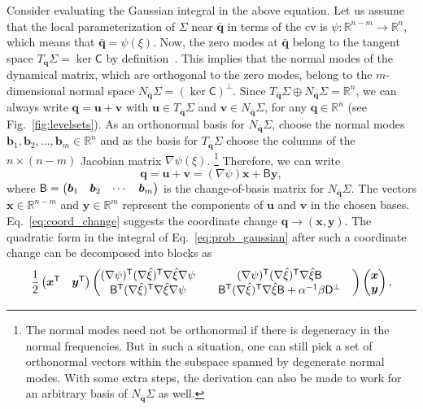Consider evaluating the Gaussian integral in the above equation.
Let us assume that the local parameterization of $\Sigma$ near $\bar{\bm{q}}$ in terms of the \ac{cv} is $\psi: \mathbb{R}^{n-m} \to \mathbb{R}^n$, which means that $\bar{\bm{q}} = \psi(\xi)$.
Now, the zero modes at $\bar{\bm{q}}$ belong to the tangent space $T_{\bar{\bm{q}}}\Sigma = \ker \mathsf{C}$ by definition~\cite{leimkuhler2005}.
This implies that the normal modes of the dynamical matrix, which are orthogonal to the zero modes, belong to the $m$-dimensional normal space $N_{\bar{\bm{q}}}\Sigma = (\ker\mathsf{C})^\perp$.
Since $T_{\bar{\bm{q}}}\Sigma \oplus N_{\bar{\bm{q}}}\Sigma = \mathbb{R}^n$, we can always write $\bm{q} = \bm{u} + \bm{v}$ with
$\bm{\bm{u}} \in T_{\bar{\bm{q}}}\Sigma$ and $\bm{v} \in N_{\bar{\bm{q}}}\Sigma$, for any $\bm{q} \in \mathbb{R}^n$ (see Fig.~\ref{fig:levelsets}).
As an orthonormal basis for $N_{\bar{\bm{q}}}\Sigma$, choose the normal modes $\bm{b}_1, \bm{b}_2, \ldots, \bm{b}_m \in \mathbb{R}^n$ and as the basis for $T_{\bar{\bm{q}}}\Sigma$ choose the columns of the $n\times(n-m)$ Jacobian matrix $\nabla\psi(\xi)$.%
\footnote{The normal modes need not be orthonormal if there is degeneracy in the normal frequencies.
But in such a situation, one can still pick a set of orthonormal vectors within the subspace spanned by degenerate normal modes.
With some extra steps, the derivation can also be made to work for an arbitrary basis of $N_{\bar{\bm{q}}}\Sigma$ as well.}
Therefore, we can write
%
\begin{equation}
  \bm{q} = \bm{u} + \bm{v} = (\nabla\psi)\bm{x} + \mathsf{B}\bm{y},
  \label{eq:coord_change}
\end{equation}
%
where $\mathsf{B}  = \begin{pmatrix}\bm{b}_1 & \bm{b}_2 & \cdots & \bm{b}_m\end{pmatrix}$ is the change-of-basis matrix for $N_{\bar{\bm{q}}}\Sigma$.
The vectors $\bm{x} \in \mathbb{R}^{n-m}$ and $\bm{y} \in \mathbb{R}^m$ represent the components of $\bm{u}$ and $\bm{v}$ in the chosen bases.
Eq.~\eqref{eq:coord_change} suggests the coordinate change $\bm{q} \to (\bm{x}, \bm{y})$.
The quadratic form in the integral of Eq.~\eqref{eq:prob_gaussian} after such a coordinate change can be decomposed into blocks as
%
\begin{equation}
  \frac{1}{2}
  \begin{pmatrix}
    \bm{x}^\mathsf{T} & \bm{y}^\mathsf{T}
  \end{pmatrix}
  \begin{pmatrix}
    (\nabla\psi)^\mathsf{T}(\nabla\hat{\xi})^\mathsf{T}\nabla{\hat{\xi}}\nabla\psi &
    \quad(\nabla\psi)^\mathsf{T}(\nabla\hat{\xi})^\mathsf{T}\nabla\hat{\xi}\mathsf{B} \\
    \mathsf{B}^\mathsf{T}(\nabla\hat{\xi})^\mathsf{T}\nabla{\hat{\xi}}\nabla\psi &
    \quad\mathsf{B}^\mathsf{T}(\nabla\hat{\xi})^\mathsf{T}\nabla\hat{\xi}\mathsf{B} + \alpha^{-1}\beta\mathsf{D}^\perp &
  \end{pmatrix}
  \begin{pmatrix}
    \bm{x}\\
    \bm{y}
  \end{pmatrix},
  \label{eq:quadratic_form}
\end{equation}
